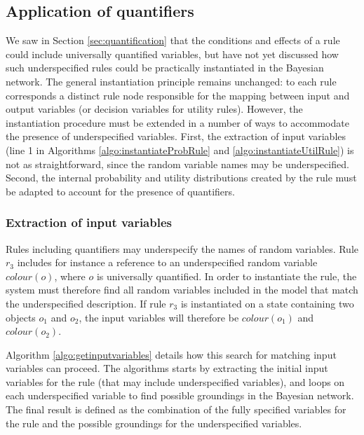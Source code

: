 \subsection{Application of quantifiers}

We saw in Section \ref{sec:quantification} that the conditions and effects of a rule could include universally quantified variables, but have not yet discussed how such underspecified rules could be practically instantiated in the Bayesian network. The general instantiation principle remains unchanged: to each rule corresponds a distinct rule node responsible for the mapping between input and output variables (or decision variables for utility rules). However, the instantiation procedure must be extended in a number of ways to accommodate the presence of underspecified variables. First, the extraction of input variables (line 1 in Algorithms \ref{algo:instantiateProbRule} and \ref{algo:instantiateUtilRule}) is not as straightforward, since the random variable names may be underspecified.  Second, the internal probability and utility distributions created by the rule must be adapted to account for the presence of quantifiers. 

\subsubsection*{Extraction of input variables}

Rules including quantifiers may underspecify the names of random variables.  Rule $r_3$ includes for instance a reference to an underspecified random variable $\textit{colour}(o)$, where $o$ is universally quantified.  In order to instantiate the rule, the system must therefore find all random variables included in the model that match the underspecified description. If rule $r_3$ is instantiated on a state containing two objects $o_1$ and $o_2$, the input variables will therefore be $\mathit{colour}(o_1)$ and $\mathit{colour}(o_2)$. 

Algorithm \ref{algo:getinputvariables} details how this search for matching input variables can proceed. The algorithms starts by extracting the initial input variables for the rule (that may include underspecified variables), and loops on each underspecified variable to find possible groundings in the Bayesian network.  The final result is defined as the combination of the fully specified variables for the rule and the possible groundings for the underspecified variables. 

